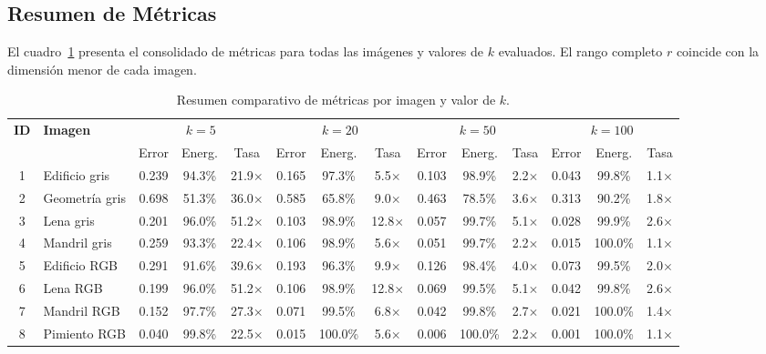 ﻿\documentclass[12pt,a4paper]{article}
\theoremstyle{definition}
\begin{document}
\subsection{Resumen de M\'{e}tricas}

El cuadro~\ref{tab:resumen} presenta el consolidado de m\'{e}tricas para todas las im\'{a}genes y valores de $k$ evaluados. El rango completo $r$ coincide con la dimensi\'{o}n menor de cada imagen.

\begin{landscape}
\begin{table}[H]
\centering
\caption{Resumen comparativo de m\'{e}tricas por imagen y valor de $k$.}
\label{tab:resumen}
\footnotesize
\begin{tabular}{@{}clcccccccccccc@{}}
\toprule
\multirow{2}{*}{\textbf{ID}} & \multirow{2}{*}{\textbf{Imagen}} & \multicolumn{3}{c}{$k=5$} & \multicolumn{3}{c}{$k=20$} & \multicolumn{3}{c}{$k=50$} & \multicolumn{3}{c}{$k=100$} \\
\cmidrule(lr){3-5} \cmidrule(lr){6-8} \cmidrule(lr){9-11} \cmidrule(lr){12-14}
& & Error & Energ. & Tasa & Error & Energ. & Tasa & Error & Energ. & Tasa & Error & Energ. & Tasa \\
\midrule
1 & Edificio gris & 0.239 & 94.3\% & 21.9$\times$ & 0.165 & 97.3\% & 5.5$\times$ & 0.103 & 98.9\% & 2.2$\times$ & 0.043 & 99.8\% & 1.1$\times$ \\
2 & Geometr\'{i}a gris & 0.698 & 51.3\% & 36.0$\times$ & 0.585 & 65.8\% & 9.0$\times$ & 0.463 & 78.5\% & 3.6$\times$ & 0.313 & 90.2\% & 1.8$\times$ \\
3 & Lena gris & 0.201 & 96.0\% & 51.2$\times$ & 0.103 & 98.9\% & 12.8$\times$ & 0.057 & 99.7\% & 5.1$\times$ & 0.028 & 99.9\% & 2.6$\times$ \\
4 & Mandril gris & 0.259 & 93.3\% & 22.4$\times$ & 0.106 & 98.9\% & 5.6$\times$ & 0.051 & 99.7\% & 2.2$\times$ & 0.015 & 100.0\% & 1.1$\times$ \\
5 & Edificio RGB & 0.291 & 91.6\% & 39.6$\times$ & 0.193 & 96.3\% & 9.9$\times$ & 0.126 & 98.4\% & 4.0$\times$ & 0.073 & 99.5\% & 2.0$\times$ \\
6 & Lena RGB & 0.199 & 96.0\% & 51.2$\times$ & 0.106 & 98.9\% & 12.8$\times$ & 0.069 & 99.5\% & 5.1$\times$ & 0.042 & 99.8\% & 2.6$\times$ \\
7 & Mandril RGB & 0.152 & 97.7\% & 27.3$\times$ & 0.071 & 99.5\% & 6.8$\times$ & 0.042 & 99.8\% & 2.7$\times$ & 0.021 & 100.0\% & 1.4$\times$ \\
8 & Pimiento RGB & 0.040 & 99.8\% & 22.5$\times$ & 0.015 & 100.0\% & 5.6$\times$ & 0.006 & 100.0\% & 2.2$\times$ & 0.001 & 100.0\% & 1.1$\times$ \\
\bottomrule
\end{tabular}
\end{table}
\end{landscape}
\end{document}
